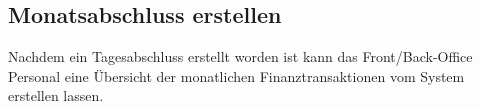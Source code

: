 \documentclass[../SubfileFeatures.tex]{subfiles}
\begin{document}
    \subsection{Monatsabschluss erstellen}
    Nachdem ein Tagesabschluss erstellt worden ist kann das Front/Back-Office Personal eine Übersicht
    der monatlichen Finanztransaktionen vom System erstellen lassen.
\end{document}

